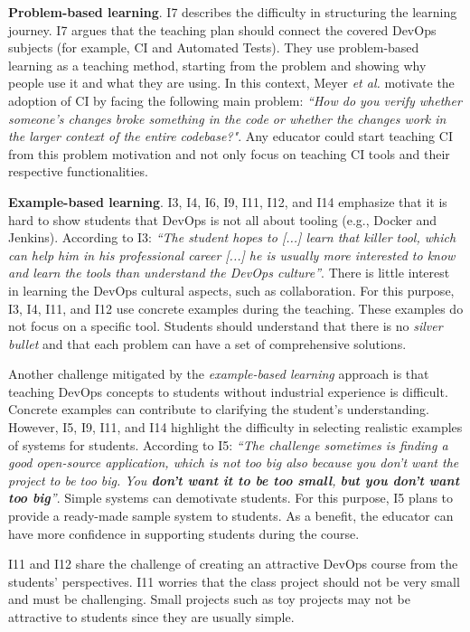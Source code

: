 \documentclass[10pt,conference]{IEEEtran}
\begin{document}
\textbf{Problem-based learning}. I7 describes the difficulty in structuring the learning journey. I7 argues that the teaching plan should connect the covered DevOps subjects (for example, CI and Automated Tests). They use problem-based learning as a teaching method, starting from the problem and showing why people use it and what they are using. In this context,  Meyer \textit{et al.} \cite{meyer:2014} motivate the adoption of CI by facing the following main problem: \textit{``How do you verify whether someone's changes broke something in the code or whether the changes work in the larger context of the entire codebase?"}. Any educator could start teaching CI from this problem motivation and not only focus on teaching CI tools and their respective functionalities.


\textbf{Example-based learning}. I3, I4, I6, I9, I11, I12, and I14 emphasize that it is hard to show students that DevOps is not all about tooling (e.g., Docker and Jenkins). According to I3: \textit{``The student hopes to [...] learn that killer tool, which can help him in his professional career [...] he is usually more interested to know and learn the tools than understand the DevOps culture''}. There is little interest in learning the DevOps cultural aspects, such as collaboration. For this purpose, I3, I4, I11, and I12 use concrete examples during the teaching. These examples do not focus on a specific tool. Students should understand that there is no \textit{silver bullet} and that each problem can have a set of comprehensive solutions.



Another challenge mitigated by the \textsl{example-based learning} approach is that teaching DevOps concepts to students without industrial experience is difficult. Concrete examples can contribute to clarifying the student’s understanding. However, I5, I9, I11, and I14 highlight the difficulty in selecting realistic examples of systems for students. According to I5: \textit{``The challenge sometimes is finding a good open-source application, which is not too big also because you don't want the project to be too big. You \textbf{don't want it to be too small}, \textbf{but you don't want too big}''}. Simple systems can demotivate students. For this purpose, I5 plans to provide a ready-made sample system to students. As a benefit, the educator can have more confidence in supporting students during the course.

I11 and I12 share the challenge of creating an attractive DevOps course from the students’ perspectives. I11 worries that the class project should not be very small and must be challenging. Small projects such as toy projects may not be attractive to students since they are usually simple.
\end{document}
